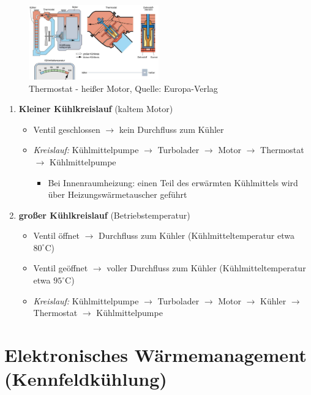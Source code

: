\begin{figure}[!ht]%
\centering
\includegraphics[width=0.5\textwidth]{images/Kuehlsystem/Kuehlsystem-7.pdf}
\caption{Thermostat - heißer Motor, Quelle: Europa-Verlag}
\end{figure}

\begin{enumerate}
\item
  \textbf{Kleiner Kühlkreislauf} (kaltem Motor)

  \begin{itemize}
  \item
    Ventil geschlossen $\to$ kein Durchfluss zum Kühler
  \item
    \emph{Kreislauf:} Kühlmittelpumpe $\to$ Turbolader $\to$ Motor
    $\to$ Thermostat $\to$ Kühlmittelpumpe

    \begin{itemize}
    \item
      Bei Innenraumheizung: einen Teil des erwärmten Kühlmittels wird
      über Heizungswärmetauscher geführt
    \end{itemize}
  \end{itemize}
\item
  \textbf{großer Kühlkreislauf} (Betriebstemperatur)

  \begin{itemize}
  \item
    Ventil öffnet $\to$ Durchfluss zum Kühler (Kühlmitteltemperatur
    etwa $80^\circ\text{C}$)
  \item
    Ventil geöffnet $\to$ voller Durchfluss zum Kühler
    (Kühlmitteltemperatur etwa $95^\circ\text{C}$)
  \item
    \emph{Kreislauf:} Kühlmittelpumpe $\to$ Turbolader $\to$ Motor
    $\to$ Kühler $\to$ Thermostat $\to$ Kühlmittelpumpe
  \end{itemize}
\end{enumerate}

\newpage

\section{Elektronisches Wärmemanagement
(Kennfeldkühlung)}\label{elektronisches-waermemanagement-kennfeldkuehlung}

